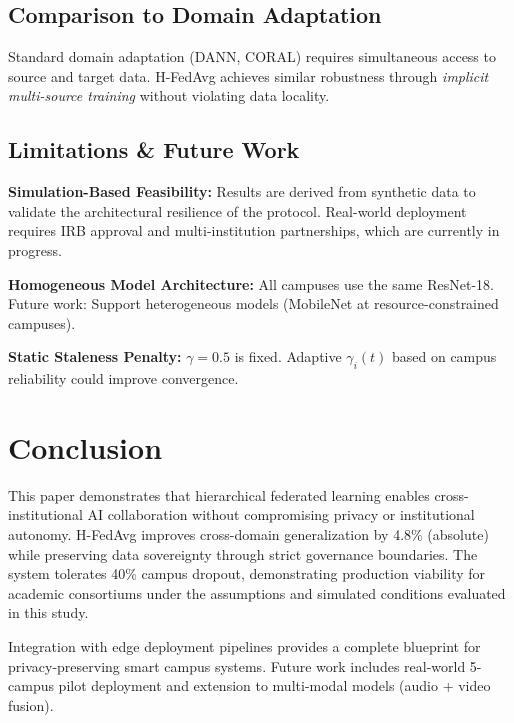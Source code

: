 \documentclass[conference]{IEEEtran}
\begin{document}
\subsection{Comparison to Domain Adaptation}

Standard domain adaptation (DANN, CORAL) requires simultaneous access to source and target data. H-FedAvg achieves similar robustness through \textit{implicit multi-source training} without violating data locality.

\subsection{Limitations \& Future Work}

\textbf{Simulation-Based Feasibility:} Results are derived from synthetic data to validate the architectural resilience of the protocol. Real-world deployment requires IRB approval and multi-institution partnerships, which are currently in progress.

\textbf{Homogeneous Model Architecture:} All campuses use the same ResNet-18. Future work: Support heterogeneous models (MobileNet at resource-constrained campuses).

\textbf{Static Staleness Penalty:} $\gamma = 0.5$ is fixed. Adaptive $\gamma_i(t)$ based on campus reliability could improve convergence.

\section{Conclusion}

This paper demonstrates that hierarchical federated learning enables cross-institutional AI collaboration without compromising privacy or institutional autonomy. H-FedAvg improves cross-domain generalization by 4.8\% (absolute) while preserving data sovereignty through strict governance boundaries. The system tolerates 40\% campus dropout, demonstrating production viability for academic consortiums under the assumptions and simulated conditions evaluated in this study.

Integration with edge deployment pipelines provides a complete blueprint for privacy-preserving smart campus systems. Future work includes real-world 5-campus pilot deployment and extension to multi-modal models (audio + video fusion).
\end{document}
